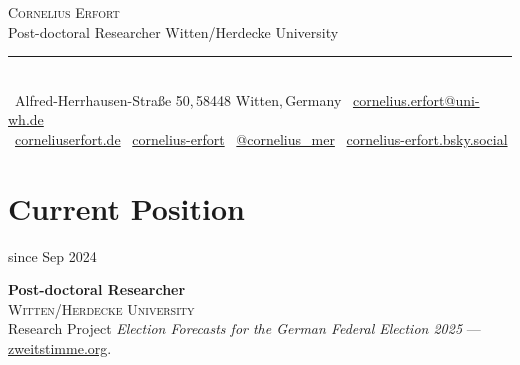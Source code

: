 \documentclass[11pt,a4paper]{article}
\newlength{\cvleftw}\setlength{\cvleftw}{0.20\textwidth}
\newlength{\cvrightw}\setlength{\cvrightw}{0.76\textwidth}
\newlength{\cvgap}\setlength{\cvgap}{0.02\textwidth}
\newenvironment{cventries}{\par\setlength{\parskip}{0pt}}{\par}
\newcommand{\cvitem}[2]{%
  \par\nopagebreak[2]%
  \noindent
  \begin{minipage}[t]{\cvleftw}\raggedright\color{cvmuted}\small\vspace{0pt}\strut #1\end{minipage}%
  \hspace{\cvgap}%
  \begin{minipage}[t]{\cvrightw}\raggedright\vspace{0pt}\strut #2\end{minipage}%
  \par\vspace{10pt plus 3pt minus 2pt}%
}
\newcommand{\cvtitle}[1]{\textbf{#1}}
\newcommand{\cvinst}[1]{\textsc{\small #1}}    %
\begin{document}
\pagestyle{fancy}

\begin{center}
  {\fontsize{26}{30}\selectfont\scshape Cornelius Erfort}\\[4pt]
  {\small\color{cvmuted}Post-doctoral Researcher \textbullet{} Witten/Herdecke University}\\[6pt]
  {\color{cvrule}\rule{0.55\textwidth}{0.4pt}}\\[8pt]
  {\small
    \faMapMarker*~Alfred-Herrhausen-Stra\ss{}e 50,\,58448 Witten,\,Germany
    \quad\textbar\quad
    \faEnvelope~\href{mailto:cornelius.erfort@uni-wh.de}{cornelius.erfort@uni-wh.de}\\[3pt]
    \faGlobe~\href{https://corneliuserfort.de}{corneliuserfort.de}
    \quad\textbar\quad
    \faGithub~\href{https://github.com/cornelius-erfort}{cornelius-erfort}
    \quad\textbar\quad
    \faTwitter~\href{https://x.com/cornelius_mer}{@cornelius\_mer}
    \quad\textbar\quad
    \faCloud~\href{https://bsky.app/profile/cornelius-erfort.bsky.social}{cornelius-erfort.bsky.social}
  }
\end{center}
\vspace{4pt}

\section*{Current Position}
\begin{cventries}
\cvitem{since Sep 2024}{%
  \cvtitle{Post-doctoral Researcher} \\
  \cvinst{Witten/Herdecke University} \\
  Research Project \emph{Election Forecasts for the German Federal Election 2025} ---
  \href{https://zweitstimme.org}{zweitstimme.org}.}
\end{cventries}

\end{document}
